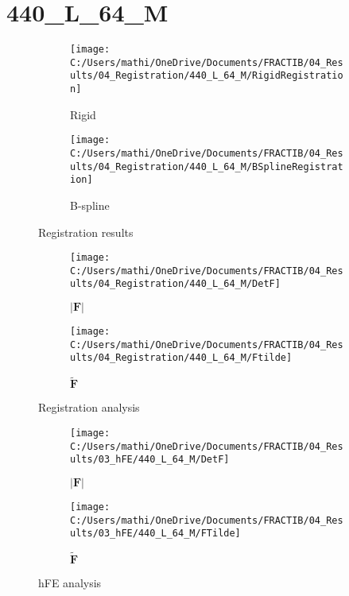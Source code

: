 \documentclass{article}%
\begin{document}
%
\newpage%
\section*{440\_L\_64\_M}%
\label{sec:440L64M}%


\begin{figure}[h!]%
\begin{subfigure}[b]{0.5\linewidth}%
\texttt{[image: C:/Users/mathi/OneDrive/Documents/FRACTIB/04\_Results/04\_Registration/440\_L\_64\_M/RigidRegistration]}%
\caption{Rigid}%
\end{subfigure}%
\begin{subfigure}[b]{0.5\linewidth}%
\texttt{[image: C:/Users/mathi/OneDrive/Documents/FRACTIB/04\_Results/04\_Registration/440\_L\_64\_M/BSplineRegistration]}%
\caption{B{-}spline}%
\end{subfigure}%
\caption{Registration results}%
\end{figure}

%


\begin{figure}[h!]%
\begin{subfigure}[b]{0.5\linewidth}%
\texttt{[image: C:/Users/mathi/OneDrive/Documents/FRACTIB/04\_Results/04\_Registration/440\_L\_64\_M/DetF]}%
\caption{$|\mathbf{F}|$}%
\end{subfigure}%
\begin{subfigure}[b]{0.5\linewidth}%
\texttt{[image: C:/Users/mathi/OneDrive/Documents/FRACTIB/04\_Results/04\_Registration/440\_L\_64\_M/Ftilde]}%
\caption{$\tilde{\mathbf{F}}$}%
\end{subfigure}%
\caption{Registration analysis}%
\end{figure}

%


\begin{figure}[h!]%
\begin{subfigure}[b]{0.5\linewidth}%
\texttt{[image: C:/Users/mathi/OneDrive/Documents/FRACTIB/04\_Results/03\_hFE/440\_L\_64\_M/DetF]}%
\caption{$|\mathbf{F}|$}%
\end{subfigure}%
\begin{subfigure}[b]{0.5\linewidth}%
\texttt{[image: C:/Users/mathi/OneDrive/Documents/FRACTIB/04\_Results/03\_hFE/440\_L\_64\_M/FTilde]}%
\caption{$\tilde{\mathbf{F}}$}%
\end{subfigure}%
\caption{hFE analysis}%
\end{figure}
\end{document}
